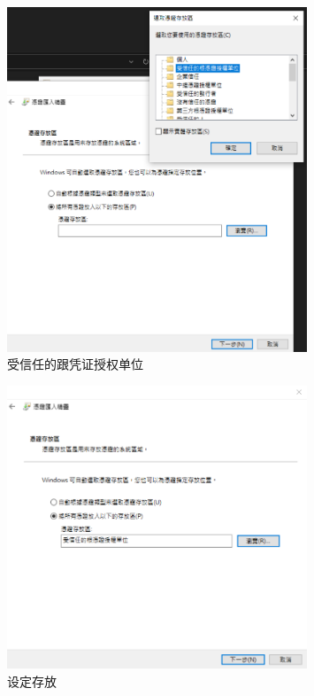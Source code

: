 \begin{figure}[htb]
\centering 
\includegraphics[width=0.80\textwidth]{img/ch1s2m9.png} 
\caption{受信任的跟凭证授权单位}
\label{Test}
\end{figure}

\begin{figure}[htb]
\centering 
\includegraphics[width=0.80\textwidth]{img/ch1s2m10.png} 
\caption{设定存放}
\label{Test}
\end{figure}

